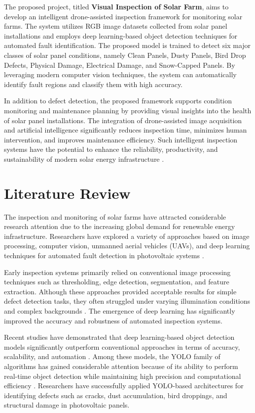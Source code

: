 The proposed project, titled \textbf{Visual Inspection of Solar Farm}, aims to develop an intelligent drone-assisted inspection framework for monitoring solar farms. The system utilizes RGB image datasets collected from solar panel installations and employs deep learning-based object detection techniques for automated fault identification. The proposed model is trained to detect six major classes of solar panel conditions, namely Clean Panels, Dusty Panels, Bird Drop Defects, Physical Damage, Electrical Damage, and Snow-Capped Panels. By leveraging modern computer vision techniques, the system can automatically identify fault regions and classify them with high accuracy.

In addition to defect detection, the proposed framework supports condition monitoring and maintenance planning by providing visual insights into the health of solar panel installations. The integration of drone-assisted image acquisition and artificial intelligence significantly reduces inspection time, minimizes human intervention, and improves maintenance efficiency. Such intelligent inspection systems have the potential to enhance the reliability, productivity, and sustainability of modern solar energy infrastructure \cite{ref8,ref9,ref10}.

\section{Literature Review}

The inspection and monitoring of solar farms have attracted considerable research attention due to the increasing global demand for renewable energy infrastructure. Researchers have explored a variety of approaches based on image processing, computer vision, unmanned aerial vehicles (UAVs), and deep learning techniques for automated fault detection in photovoltaic systems \cite{ref2,ref3}.

Early inspection systems primarily relied on conventional image processing techniques such as thresholding, edge detection, segmentation, and feature extraction. Although these approaches provided acceptable results for simple defect detection tasks, they often struggled under varying illumination conditions and complex backgrounds \cite{ref13}. The emergence of deep learning has significantly improved the accuracy and robustness of automated inspection systems.

Recent studies have demonstrated that deep learning-based object detection models significantly outperform conventional approaches in terms of accuracy, scalability, and automation \cite{ref7,ref9,ref11}. Among these models, the YOLO family of algorithms has gained considerable attention because of its ability to perform real-time object detection while maintaining high precision and computational efficiency \cite{ref11,ref12,ref24}. Researchers have successfully applied YOLO-based architectures for identifying defects such as cracks, dust accumulation, bird droppings, and structural damage in photovoltaic panels.

